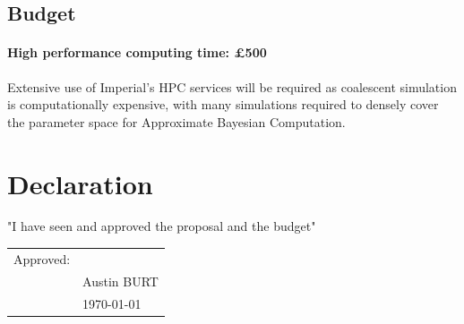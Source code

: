 \documentclass[11pt, a4paper]{article}
\begin{document}
\begin{linenumbers}
\section*{Budget}
\paragraph{High performance computing time: £500}
Extensive use of Imperial’s HPC services will be required as coalescent simulation is computationally expensive, with many simulations required to densely cover the parameter space for Approximate Bayesian Computation. 
\end{linenumbers}




\newpage
\section*{Declaration}
\vspace{1cm}
{"I have seen and approved the proposal and the budget"}\\
\vspace{1cm}




\begin{tabular}{@{}p{.5in}p{4in}@{}}
Approved: & \hrulefill \\
& Austin BURT \\
& \today \\
\end{tabular}
\end{document}

